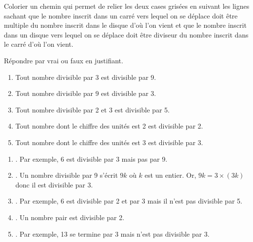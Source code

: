 \begin{Maquette}[Fiche,CorrigeFin,Colonnes=2]{}
\begin{multicols}{2}
      \begin{Solution}
         \smallskip
         \LabyNombre[Nom=Ex7,Graine=1,Multiple=6,Couleur=LightGrey,Echelle=1,Solution,CouleurChemin=1.5RoyalBlue]
      \end{Solution}
      
      
      \begin{exercice} %
         Colorier un chemin qui permet de relier les deux cases grisées en suivant les lignes sachant que le nombre inscrit dans un carré vers lequel on se déplace doit être multiple du nombre inscrit dans le disque d’où l’on vient et que le nombre inscrit dans un disque vers lequel on se déplace doit être diviseur du nombre inscrit dans le carré d’où l’on vient. \par \medskip
         \LabyNombre[Nom=Ex8,Graine=2,Multiplication,Multiple=6,Longueur=7,Largeur=5,Couleur=LightGrey,Echelle=0.6]
      \end{exercice}

      \begin{Solution}
         \medskip
         \LabyNombre[Nom=Ex8,Graine=2,Multiplication,Multiple=6,Longueur=7,Largeur=5,Couleur=LightGrey,Echelle=0.6,Solution]
      \end{Solution}
   
      
      \begin{exercice}[Dur] %
         Répondre par vrai ou faux en justifiant.
         \begin{enumerate}
            \item Tout nombre divisible par 3 est divisible par 9.
            \item Tout nombre divisible par 9 est divisible par 3.
            \item Tout nombre divisible par 2 et 3 est divisible par 5.
            \item Tout nombre dont le chiffre des unités est 2 est divisible par 2. 
            \item Tout nombre dont le chiffre des unités est 3 est divisible par 3.
         \end{enumerate}
      \end{exercice}

      \begin{Solution}
         \begin{enumerate}
            \item {}. Par exemple, 6 est divisible par 3 mais pas par 9.
            \item {}. Un nombre divisible par 9 s'écrit $9k$ où $k$ est un entier. Or, $9k =3\times(3k)$ donc il est divisible par 3.
            \item {}. Par exemple, 6 est divisible par 2 et par 3 mais il n'est pas divisible par 5.
            \item {}. Un nombre pair est divisible par 2.
            \item {}. Par exemple, 13 se termine par 3 mais n'est pas divisible par 3.
         \end{enumerate}
      \end{Solution}


\end{multicols}
\end{Maquette}
